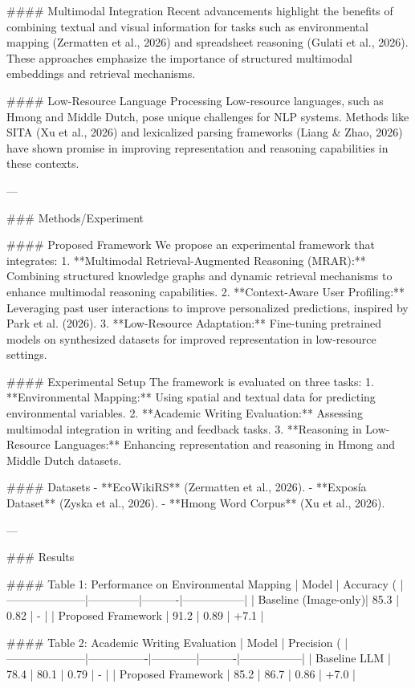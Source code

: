 #### Multimodal Integration  
Recent advancements highlight the benefits of combining textual and visual information for tasks such as environmental mapping (Zermatten et al., 2026) and spreadsheet reasoning (Gulati et al., 2026). These approaches emphasize the importance of structured multimodal embeddings and retrieval mechanisms.

#### Low-Resource Language Processing  
Low-resource languages, such as Hmong and Middle Dutch, pose unique challenges for NLP systems. Methods like SITA (Xu et al., 2026) and lexicalized parsing frameworks (Liang & Zhao, 2026) have shown promise in improving representation and reasoning capabilities in these contexts.

---

### Methods/Experiment  

#### Proposed Framework  
We propose an experimental framework that integrates:  
1. **Multimodal Retrieval-Augmented Reasoning (MRAR):** Combining structured knowledge graphs and dynamic retrieval mechanisms to enhance multimodal reasoning capabilities.  
2. **Context-Aware User Profiling:** Leveraging past user interactions to improve personalized predictions, inspired by Park et al. (2026).  
3. **Low-Resource Adaptation:** Fine-tuning pretrained models on synthesized datasets for improved representation in low-resource settings.  

#### Experimental Setup  
The framework is evaluated on three tasks:  
1. **Environmental Mapping:** Using spatial and textual data for predicting environmental variables.  
2. **Academic Writing Evaluation:** Assessing multimodal integration in writing and feedback tasks.  
3. **Reasoning in Low-Resource Languages:** Enhancing representation and reasoning in Hmong and Middle Dutch datasets.  

#### Datasets  
- **EcoWikiRS** (Zermatten et al., 2026).  
- **Exposía Dataset** (Zyska et al., 2026).  
- **Hmong Word Corpus** (Xu et al., 2026).  

---

### Results  

#### Table 1: Performance on Environmental Mapping  
| Model               | Accuracy (%
|---------------------|--------------|----------|-----------------|
| Baseline (Image-only)| 85.3         | 0.82     | -               |
| Proposed Framework   | 91.2         | 0.89     | +7.1            |

#### Table 2: Academic Writing Evaluation  
| Model               | Precision (%
|---------------------|----------------|------------|----------|-----------------|
| Baseline LLM        | 78.4           | 80.1       | 0.79     | -               |
| Proposed Framework   | 85.2           | 86.7       | 0.86     | +7.0            |

